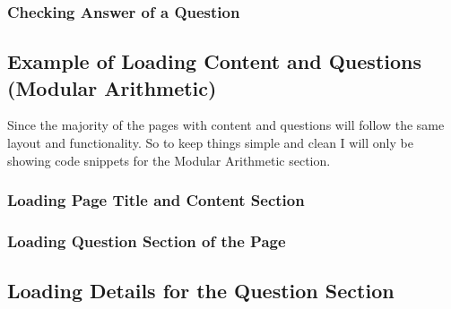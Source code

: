 \subsubsection{Checking Answer of a Question}


\subsection{Example of Loading Content and Questions (Modular Arithmetic)}

Since the majority of the pages with content and questions will follow the same layout and functionality. So to keep things simple and clean I will only be showing code snippets for the Modular Arithmetic section.

\subsubsection{Loading Page Title and Content Section}


\subsubsection{Loading Question Section of the Page}


\subsection{Loading Details for the Question Section}

